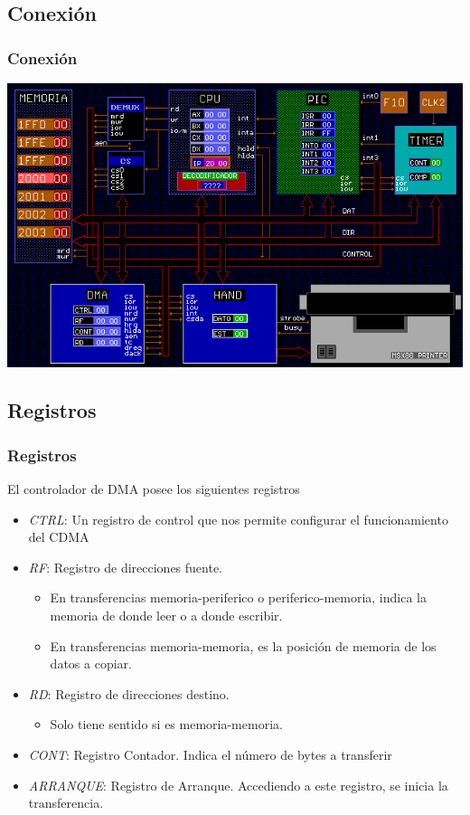 \documentclass{beamer}
\begin{document}
\subsection{Conexión}
\begin{frame}
\frametitle{Conexión}
\includegraphics[scale=0.45]{conf3.png}
\end{frame}

\subsection{Registros}
\begin{frame}
\frametitle{Registros}
  El controlador de DMA posee los siguientes registros
\begin{itemize}
 \item \emph{CTRL}: Un registro de control que nos permite configurar el funcionamiento del CDMA
 \item \emph{RF}: Registro de direcciones fuente.
  \begin{itemize}
    \item En transferencias memoria-periferico o periferico-memoria, indica la memoria de donde leer o a donde escribir.
    \item En transferencias memoria-memoria, es la posición de memoria de los datos a copiar.
  \end{itemize}
 
 \item \emph{RD}: Registro de direcciones destino. 
  \begin{itemize}
    \item Solo tiene sentido si es memoria-memoria.
  \end{itemize}
 \item \emph{CONT}: Registro Contador. Indica el número de bytes a transferir
 \item \emph{ARRANQUE}: Registro de Arranque. Accediendo a este registro, se inicia la transferencia.
\end{itemize}
\end{frame}
\end{document}
